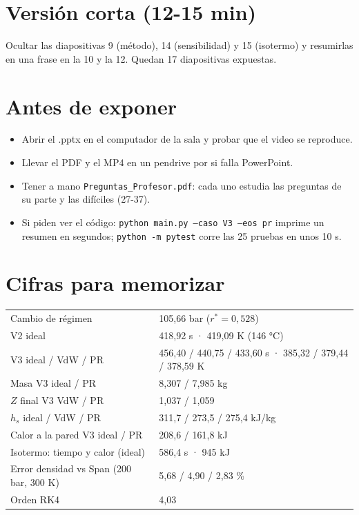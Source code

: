 \documentclass[11pt]{article}
\begin{document}
\section{Versión corta (12-15 min)}\label{sec:corto}
Ocultar las diapositivas 9 (método), 14 (sensibilidad) y 15 (isotermo) y resumirlas en una frase en la 10 y la 12.
Quedan 17 diapositivas expuestas.

\section{Antes de exponer}
\begin{itemize}
\item Abrir el .pptx en el computador de la sala y probar que el video se reproduce.
\item Llevar el PDF y el MP4 en un pendrive por si falla PowerPoint.
\item Tener a mano \texttt{Preguntas\_Profesor.pdf}: cada uno estudia las preguntas de su parte y las difíciles (27-37).
\item Si piden ver el código: \texttt{python main.py --caso V3 --eos pr} imprime un resumen en segundos; \texttt{python -m pytest} corre las 25 pruebas en unos 10 s.
\end{itemize}

\section{Cifras para memorizar}
\begin{center}\small
\begin{tabular}{ll}\toprule
Cambio de régimen & 105,66 bar ($r^*=0{,}528$)\\
V2 ideal & 418,92 s · 419,09 K (146 °C)\\
V3 ideal / VdW / PR & 456,40 / 440,75 / 433,60 s · 385,32 / 379,44 / 378,59 K\\
Masa V3 ideal / PR & 8,307 / 7,985 kg\\
$Z$ final V3 VdW / PR & 1,037 / 1,059\\
$h_s$ ideal / VdW / PR & 311,7 / 273,5 / 275,4 kJ/kg\\
Calor a la pared V3 ideal / PR & 208,6 / 161,8 kJ\\
Isotermo: tiempo y calor (ideal) & 586,4 s · 945 kJ\\
Error densidad vs Span (200 bar, 300 K) & 5,68 / 4,90 / 2,83 \%\\
Orden RK4 & 4,03\\\bottomrule
\end{tabular}\end{center}
\end{document}
